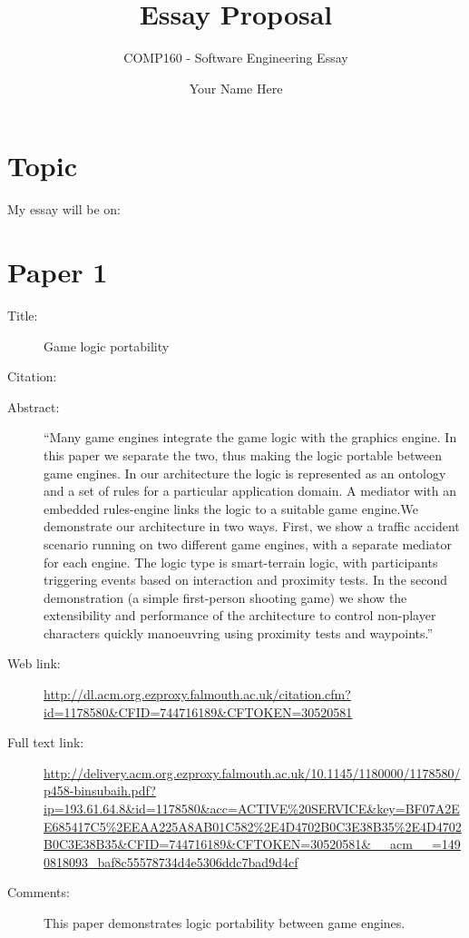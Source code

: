 \documentclass{scrartcl}
\title{Essay Proposal}
\subtitle{COMP160 - Software Engineering Essay}
\author{Your Name Here}
\begin{document}
\maketitle

\section*{Topic}

My essay will be on:


\section*{Paper 1}
\begin{description}
\item[Title:] Game logic portability
\item[Citation:] \cite{GameLogic}
\item[Abstract:] ``Many game engines integrate the game logic with the graphics engine. In this paper we separate the two, thus making the logic portable between game engines. In our architecture the logic is represented as an ontology and a set of rules for a particular application domain. A mediator with an embedded rules-engine links the logic to a suitable game engine.We demonstrate our architecture in two ways. First, we show a traffic accident scenario running on two different game engines, with a separate mediator for each engine. The logic type is smart-terrain logic, with participants triggering events based on interaction and proximity tests. In the second demonstration (a simple first-person shooting game) we show the extensibility and performance of the architecture to control non-player characters quickly manoeuvring using proximity tests and waypoints.''
\item[Web link:] \url{http://dl.acm.org.ezproxy.falmouth.ac.uk/citation.cfm?id=1178580&CFID=744716189&CFTOKEN=30520581}
\item[Full text link:] \url{http://delivery.acm.org.ezproxy.falmouth.ac.uk/10.1145/1180000/1178580/p458-binsubaih.pdf?ip=193.61.64.8&id=1178580&acc=ACTIVE%20SERVICE&key=BF07A2EE685417C5%2EEAA225A8AB01C582%2E4D4702B0C3E38B35%2E4D4702B0C3E38B35&CFID=744716189&CFTOKEN=30520581&__acm__=1490818093_baf8c55578734d4e5306ddc7bad9d4cf}
\item[Comments:] This paper demonstrates logic portability between game engines.
\end{description}
\end{document}
